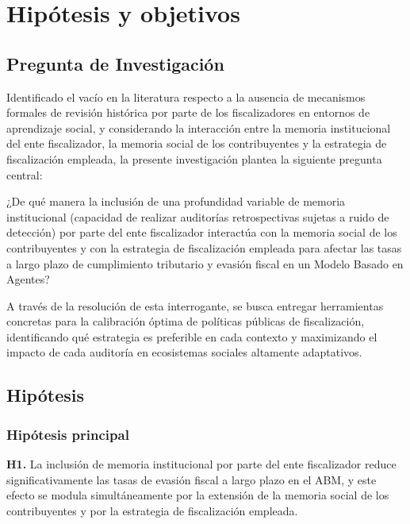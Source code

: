 \chapter{Hipótesis y objetivos} %
\label{sec:Hipotesis} %

\section{Pregunta de Investigación}
\label{sec:pregunta}

Identificado el vacío en la literatura respecto a la ausencia de mecanismos formales de revisión histórica por parte de los fiscalizadores en entornos de aprendizaje social, y considerando la interacción entre la memoria institucional del ente fiscalizador, la memoria social de los contribuyentes y la estrategia de fiscalización empleada, la presente investigación plantea la siguiente pregunta central:

¿De qué manera la inclusión de una profundidad variable de memoria institucional (capacidad de realizar auditorías retrospectivas sujetas a ruido de detección) por parte del ente fiscalizador interactúa con la memoria social de los contribuyentes y con la estrategia de fiscalización empleada para afectar las tasas a largo plazo de cumplimiento tributario y evasión fiscal en un Modelo Basado en Agentes?

A través de la resolución de esta interrogante, se busca entregar herramientas concretas para la calibración óptima de políticas públicas de fiscalización, identificando qué estrategia es preferible en cada contexto y maximizando el impacto de cada auditoría en ecosistemas sociales altamente adaptativos.

\section{Hipótesis}
\label{sec:hipotesis}

\subsection{Hipótesis principal}
\label{sec:h1}

\textbf{H1.} La inclusión de memoria institucional por parte del ente fiscalizador reduce significativamente las tasas de evasión fiscal a largo plazo en el ABM, y este efecto se modula simultáneamente por la extensión de la memoria social de los contribuyentes y por la estrategia de fiscalización empleada.

